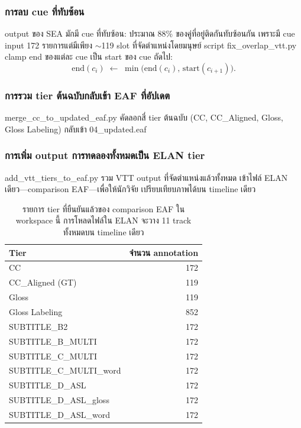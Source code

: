 \documentclass[11pt,a4paper]{article}
\def\texttt#1{#1}%
\def\textbf#1{#1}%
\def\emph#1{#1}%
\begin{document}
\subsubsection{การลบ cue ที่ทับซ้อน}
output ของ SEA มักมี cue ที่ทับซ้อน: ประมาณ 88\% ของคู่ที่อยู่ติดกันทับซ้อนกัน
เพราะมี cue input 172 รายการแต่มีเพียง $\sim$119 slot ที่จัดตำแหน่งโดยมนุษย์
script \texttt{fix\_overlap\_vtt.py} clamp end ของแต่ละ cue
เป็น start ของ cue ถัดไป:
\[
\mathrm{end}(c_i) \;\leftarrow\; \min\bigl(\mathrm{end}(c_i),\,
\mathrm{start}(c_{i+1})\bigr).
\]

\subsubsection{การรวม tier ต้นฉบับกลับเข้า EAF ที่อัปเดต}
\texttt{merge\_cc\_to\_updated\_eaf.py} คัดลอกสี่ tier ต้นฉบับ
(\texttt{CC}, \texttt{CC\_Aligned}, \texttt{Gloss}, \texttt{Gloss Labeling})
กลับเข้า \texttt{04\_updated.eaf}

\subsubsection{การเพิ่ม output การทดลองทั้งหมดเป็น ELAN tier}
\label{sec:add-tiers}
\texttt{add\_vtt\_tiers\_to\_eaf.py} รวม VTT output ที่จัดตำแหน่งแล้วทั้งหมด
เข้าไฟล์ ELAN เดียว---\emph{comparison EAF}---เพื่อให้นักวิจัย
เปรียบเทียบภาพได้บน timeline เดียว

\begin{table}[h]
\centering
\small
\begin{tabular}{lr}
\toprule
\textbf{Tier} & \textbf{จำนวน annotation} \\
\midrule
\texttt{CC}                           & 172 \\
\texttt{CC\_Aligned} (GT)             & 119 \\
\texttt{Gloss}                        & 119 \\
\texttt{Gloss Labeling}               & 852 \\
\texttt{SUBTITLE\_B2}                 & 172 \\
\texttt{SUBTITLE\_B\_MULTI}           & 172 \\
\texttt{SUBTITLE\_C\_MULTI}           & 172 \\
\texttt{SUBTITLE\_C\_MULTI\_word}     & 172 \\
\texttt{SUBTITLE\_D\_ASL}             & 172 \\
\texttt{SUBTITLE\_D\_ASL\_gloss}      & 172 \\
\texttt{SUBTITLE\_D\_ASL\_word}       & 172 \\
\bottomrule
\end{tabular}
\caption{รายการ tier ที่ยืนยันแล้วของ comparison EAF ใน workspace นี้
การโหลดไฟล์ใน ELAN จะวาง 11 track ทั้งหมดบน timeline เดียว}
\label{tab:comparison-eaf}
\end{table}
\end{document}
